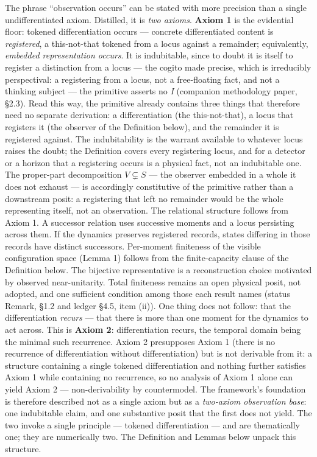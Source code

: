 \documentclass[
]{article}
\begin{document}
The phrase ``observation occurs'' can be stated with more precision than
a single undifferentiated axiom. Distilled, it is \emph{two axioms}.
\textbf{Axiom 1} is the evidential floor: tokened differentiation occurs
--- concrete differentiated content is \emph{registered}, a
this-not-that tokened from a locus against a remainder; equivalently,
\emph{embedded representation occurs}. It is indubitable, since to doubt
it is itself to register a distinction from a locus --- the cogito made
precise, which is irreducibly perspectival: a registering from a locus,
not a free-floating fact, and not a thinking subject --- the primitive
asserts no \emph{I} (companion methodology paper, §2.3). Read this way,
the primitive already contains three things that therefore need no
separate derivation: a differentiation (the this-not-that), a locus that
registers it (the observer of the Definition below), and the remainder
it is registered against. The indubitability is the warrant available to
whatever locus raises the doubt; the Definition covers every registering
locus, and for a detector or a horizon that a registering occurs is a
physical fact, not an indubitable one. The proper-part decomposition
\(V \subsetneq S\) --- the observer embedded in a whole it does not
exhaust --- is accordingly constitutive of the primitive rather than a
downstream posit: a registering that left no remainder would be the
whole representing itself, not an observation. The relational structure
follows from Axiom 1. A successor relation uses successive moments and a
locus persisting across them. If the dynamics preserves registered
records, states differing in those records have distinct successors.
Per-moment finiteness of the visible configuration space (Lemma 1)
follows from the finite-capacity clause of the Definition below. The
bijective representative is a reconstruction choice motivated by
observed near-unitarity. Total finiteness remains an open physical
posit, not adopted, and one sufficient condition among those each result
names (status Remark, §1.2 and ledger §4.5, item (ii)). One thing does
not follow: that the differentiation \emph{recurs} --- that there is
more than one moment for the dynamics to act across. This is
\textbf{Axiom 2}: differentiation recurs, the temporal domain being the
minimal such recurrence. Axiom 2 presupposes Axiom 1 (there is no
recurrence of differentiation without differentiation) but is not
derivable from it: a structure containing a single tokened
differentiation and nothing further satisfies Axiom 1 while containing
no recurrence, so no analysis of Axiom 1 alone can yield Axiom 2 ---
non-derivability by countermodel. The framework's foundation is
therefore described not as a single axiom but as a \emph{two-axiom
observation base}: one indubitable claim, and one substantive posit that
the first does not yield. The two invoke a single principle --- tokened
differentiation --- and are thematically one; they are numerically two.
The Definition and Lemmas below unpack this structure.
\end{document}
